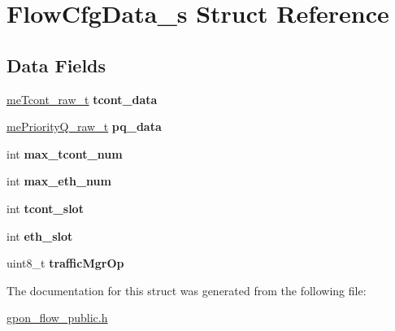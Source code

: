 \hypertarget{structFlowCfgData__s}{}\section{Flow\+Cfg\+Data\+\_\+s Struct Reference}
\label{structFlowCfgData__s}
\subsection*{Data Fields}
\begin{DoxyCompactItemize}
\item 
\mbox{\label{structFlowCfgData__s_a45262e1d02b7f85a6723fd4744fc9118}} 
\hyperlink{structmeTcont__raw__s}{me\+Tcont\+\_\+raw\+\_\+t} {\bfseries tcont\+\_\+data}
\item 
\mbox{\label{structFlowCfgData__s_a0cffbebb987f01ac0e9fa69b605e0651}} 
\hyperlink{structmePriorityQ__raw__s}{me\+Priority\+Q\+\_\+raw\+\_\+t} {\bfseries pq\+\_\+data}
\item 
\mbox{\label{structFlowCfgData__s_abf3548d7402f9077ec0f5a6079af32c2}} 
int {\bfseries max\+\_\+tcont\+\_\+num}
\item 
\mbox{\label{structFlowCfgData__s_ac58d6ea2a5dfd8c9b11784528b375745}} 
int {\bfseries max\+\_\+eth\+\_\+num}
\item 
\mbox{\label{structFlowCfgData__s_aec2146c7e2f9ba054c7ece6452888043}} 
int {\bfseries tcont\+\_\+slot}
\item 
\mbox{\label{structFlowCfgData__s_aeb449b511c1533d9043d36d58916dd3e}} 
int {\bfseries eth\+\_\+slot}
\item 
\mbox{\label{structFlowCfgData__s_a02016885de8f533fd70dac1ecdc6aecc}} 
uint8\+\_\+t {\bfseries traffic\+Mgr\+Op}
\end{DoxyCompactItemize}


The documentation for this struct was generated from the following file\+:\begin{DoxyCompactItemize}
\item 
\hyperlink{gpon__flow__public_8h}{gpon\+\_\+flow\+\_\+public.\+h}\end{DoxyCompactItemize}
